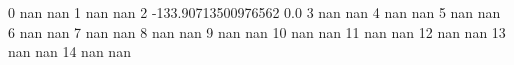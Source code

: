 0 nan nan
1 nan nan
2 -133.90713500976562 0.0
3 nan nan
4 nan nan
5 nan nan
6 nan nan
7 nan nan
8 nan nan
9 nan nan
10 nan nan
11 nan nan
12 nan nan
13 nan nan
14 nan nan
